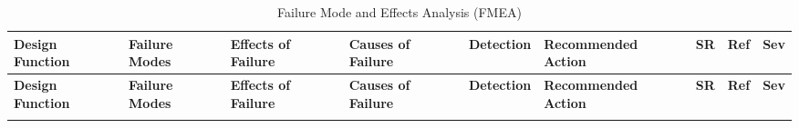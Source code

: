 \documentclass[12pt]{article}
\begin{document}
\begin{longtable}{|L{2.0cm}|L{1.8cm}|L{1.9cm}|L{1.9cm}|L{1.8cm}|L{2.4cm}|L{0.9cm}|L{1.1cm}|L{1cm}|}
\caption{Failure Mode and Effects Analysis (FMEA)}\label{tab:fmea}\\
\hline
{}
\textbf{Design Function} & \textbf{Failure Modes} & \textbf{Effects of Failure} & \textbf{Causes of Failure} & \textbf{Detection} & \textbf{Recommended Action} & \textbf{SR} & \textbf{Ref} & \textbf{Sev} \\
\hline
\endfirsthead

\hline
{}
\textbf{Design Function} & \textbf{Failure Modes} & \textbf{Effects of Failure} & \textbf{Causes of Failure} & \textbf{Detection} & \textbf{Recommended Action} & \textbf{SR} & \textbf{Ref} & \textbf{Sev} \\
\hline
\endhead

\hline
\endfoot

\hline
\endlastfoot


\end{longtable}
\end{document}

